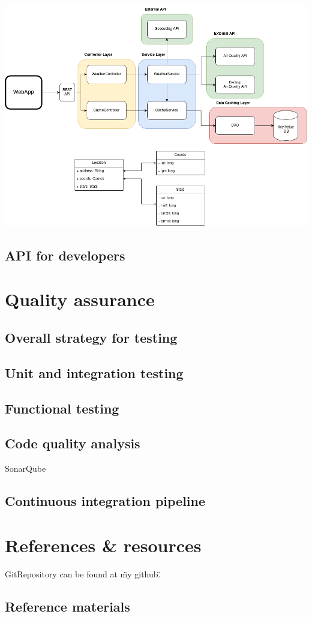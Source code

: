 \documentclass[12pt]{article}
\begin{document}
\includegraphics[scale=.4]{architecture.png}

\subsection{API for developers}

\section{Quality assurance}

\subsection{Overall strategy for testing}

\subsection{Unit and integration testing}

\subsection{Functional testing}

\subsection{Code quality analysis}

SonarQube

\subsection{Continuous integration pipeline}

\section{References \& resources}

GitRepository can be found at \"my github\".
\subsection{Reference materials}
\end{document}
